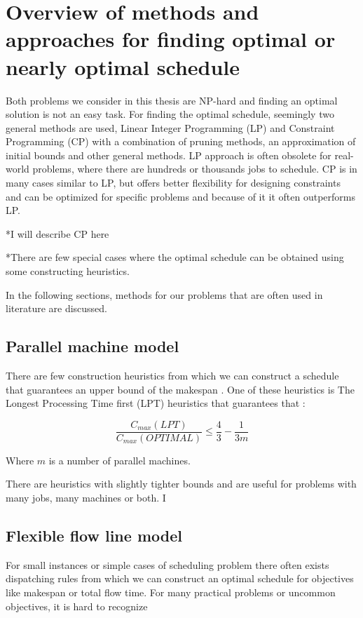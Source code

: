 \documentclass{ctuthesis}
\begin{document}
\section{Overview of methods and approaches for finding optimal or nearly optimal schedule}

Both problems we consider in this thesis are NP-hard \cite{complexity} and finding an optimal solution is not an easy task. For finding the optimal schedule, seemingly two general methods are used, Linear Integer Programming (LP) and Constraint Programming (CP) with a combination of pruning methods, an approximation of initial bounds and other general methods. LP approach is often obsolete for real-world problems, where there are hundreds or thousands jobs to schedule. CP is in many cases similar to LP, but offers better flexibility for designing constraints and can be optimized for specific problems and because of it it often outperforms LP.

*I will describe CP here

*There are few special cases where the optimal schedule can be obtained using some constructing heuristics. 

In the following sections, methods for our problems that are often used in literature are discussed.

\subsection{Parallel machine model}

There are few construction heuristics from which we can construct a schedule that guarantees an upper bound of the makespan \cite{gram}. One of these heuristics is The Longest Processing Time first (LPT) heuristics \cite{pinedo} that guarantees that \cite{gram1969}:

\begin{equation}
\dfrac{C_{max}(LPT)}{C_{max}(OPTIMAL)} \leq \dfrac{4}{3} - \dfrac{1}{3m}
\end{equation}

Where $m$ is a number of parallel machines.

There are heuristics with slightly tighter bounds and are useful for problems with many jobs, many machines or both. I 

\subsection{Flexible flow line model}

For small instances or simple cases of scheduling problem there often exists dispatching rules from which we can construct an optimal schedule for objectives like makespan or total flow time. For many practical problems or uncommon objectives, it is hard to recognize 
\end{document}
